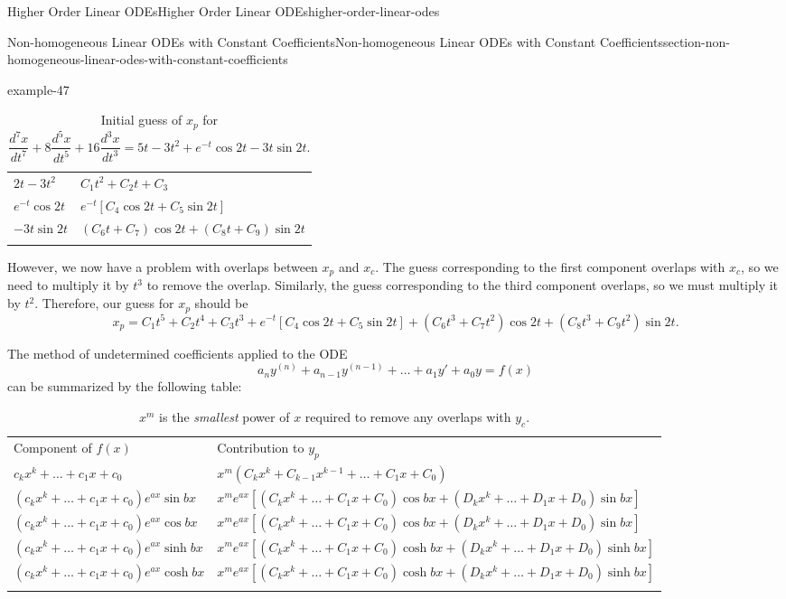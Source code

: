 \documentclass[oneside,10pt,]{book}
\numberwithin{equation}{section}
\newcommand{\hrulethick} {\noalign{\hrule height 0.11em}}
\newcommand{\dv}[3][]{\dfrac{d^{#1} #2}{d #3^{#1}}}
\newcommand{\brackets}[1]{\left[ #1 \right]}
\newcommand{\parens}[1]{\left( #1 \right)}
\begin{document}
\begin{chapterptx}{Higher Order Linear ODEs}{}{Higher Order Linear ODEs}{}{}{higher-order-linear-odes}
\begin{sectionptx}{Non-homogeneous Linear ODEs with Constant Coefficients}{}{Non-homogeneous Linear ODEs with Constant Coefficients}{}{}{section-non-homogeneous-linear-odes-with-constant-coefficients}
\begin{example}{}{example-47}
\begin{table}
\begin{tabular}{ll}
\(2t-3t^{2}\)&\(C_{1}t^{2}+C_{2}t+C_{3}\)\tabularnewline[0pt]
\(e^{-t}\cos2t\)&\(e^{-t}\brackets{C_{4}\cos2t+C_{5}\sin2t}\)\tabularnewline[0pt]
\(-3t\sin2t\)&\(\parens{C_{6}t+C_{7}}\cos2t+\parens{C_{8}t+C_{9}}\sin2t\)\tabularnewline\hrulethick
\end{tabular}
\caption{Initial guess of \(x_{p}\) for \(\dv[7]{x}{t}+8\dv[5]{x}{t}+16\dv[3]{x}{t} = 5t-3t^{2}+e^{-t}\cos2t-3t\sin2t.\)\label{table-6}}
\end{table}
\hypertarget{p-291}{}%
However, we now have a problem with overlaps between \(x_{p}\) and \(x_{c}\). The guess corresponding to the first component overlaps with \(x_{c}\), so we need to multiply it by \(t^{3}\) to remove the overlap. Similarly, the guess corresponding to the third component overlaps, so we must multiply it by \(t^{2}\). Therefore, our guess for \(x_{p}\) should be%
\begin{equation*}
x_{p} = C_{1}t^{5}+C_{2}t^{4}+C_{3}t^{3}+e^{-t}\brackets{C_{4}\cos2t+C_{5}\sin2t}+(C_{6}t^{3}+C_{7}t^{2})\cos2t+(C_{8}t^{3}+C_{9}t^{2})\sin2t.
\end{equation*}
%
\end{example}
\hypertarget{p-292}{}%
The method of undetermined coefficients applied to the ODE%
\begin{equation*}
a_{n}y^{(n)}+a_{n-1}y^{(n-1)}+\dots+a_{1}y'+a_{0}y = f(x)   
\end{equation*}
can be summarized by the following table:%
\begin{table}
\centering
\begin{tabular}{ll}\hrulethick
Component of \(f(x)\)&Contribution to \(y_{p}\)\tabularnewline\hrulethick
\(c_{k}x^{k}+\dots+c_{1}x+c_{0}\)&\(x^{m}(C_{k}x^{k}+C_{k-1}x^{k-1}+\dots+C_{1}x+C_{0})\)\tabularnewline[0pt]
\((c_{k}x^{k}+\dots+c_{1}x+c_{0})e^{ax}\sin bx\)&\(x^{m}e^{ax}\brackets{(C_{k}x^{k}+\dots+C_{1}x+C_{0})\cos bx+(D_{k}x^{k}+\dots+D_{1}x+D_{0})\sin bx}\)\tabularnewline[0pt]
\((c_{k}x^{k}+\dots+c_{1}x+c_{0})e^{ax}\cos bx\)&\(x^{m}e^{ax}\brackets{(C_{k}x^{k}+\dots+C_{1}x+C_{0})\cos bx+(D_{k}x^{k}+\dots+D_{1}x+D_{0})\sin bx}\)\tabularnewline[0pt]
\((c_{k}x^{k}+\dots+c_{1}x+c_{0})e^{ax}\sinh bx\)&\(x^{m}e^{ax}\brackets{(C_{k}x^{k}+\dots+C_{1}x+C_{0})\cosh bx+(D_{k}x^{k}+\dots+D_{1}x+D_{0})\sinh bx}\)\tabularnewline[0pt]
\((c_{k}x^{k}+\dots+c_{1}x+c_{0})e^{ax}\cosh bx\)&\(x^{m}e^{ax}\brackets{(C_{k}x^{k}+\dots+C_{1}x+C_{0})\cosh bx+(D_{k}x^{k}+\dots+D_{1}x+D_{0})\sinh bx}\)\tabularnewline\hrulethick
\end{tabular}
\caption{\(x^m\) is the \emph{smallest} power of \(x\) required to remove any overlaps with \(y_{c}\).\label{table-7}}

\end{table}
\end{sectionptx}
\end{chapterptx}
\end{document}
